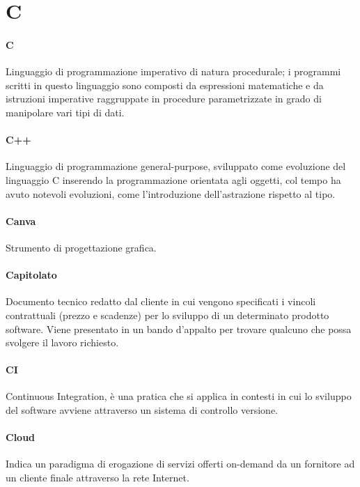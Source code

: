 \documentclass[]{article}
\begin{document}
	\newpage
	
	\section*{C}
	
	\paragraph*{C}
	Linguaggio di programmazione imperativo di natura procedurale; i programmi scritti in questo linguaggio sono composti da espressioni matematiche e da istruzioni imperative raggruppate in procedure parametrizzate in grado di manipolare vari tipi di dati.

	\paragraph*{C++}
	Linguaggio di programmazione general-purpose, sviluppato come evoluzione del linguaggio C inserendo la programmazione orientata agli oggetti, col tempo ha avuto notevoli evoluzioni, come l'introduzione dell'astrazione rispetto al tipo.
	
	\paragraph*{Canva}
	Strumento di progettazione grafica.
	
	\paragraph*{Capitolato}
	Documento tecnico redatto dal cliente in cui vengono specificati i vincoli contrattuali	(prezzo e scadenze) per lo sviluppo di un determinato prodotto software. Viene presentato in un bando d'appalto per trovare qualcuno che possa svolgere il lavoro richiesto.
	
	\paragraph*{CI}
	Continuous Integration, è una pratica che si applica in contesti in cui lo sviluppo del software avviene attraverso un sistema di controllo versione.
	
	\paragraph*{Cloud}
	Indica un paradigma di erogazione di servizi offerti on-demand da un fornitore ad un cliente finale attraverso la rete Internet.
	
\end{document}
